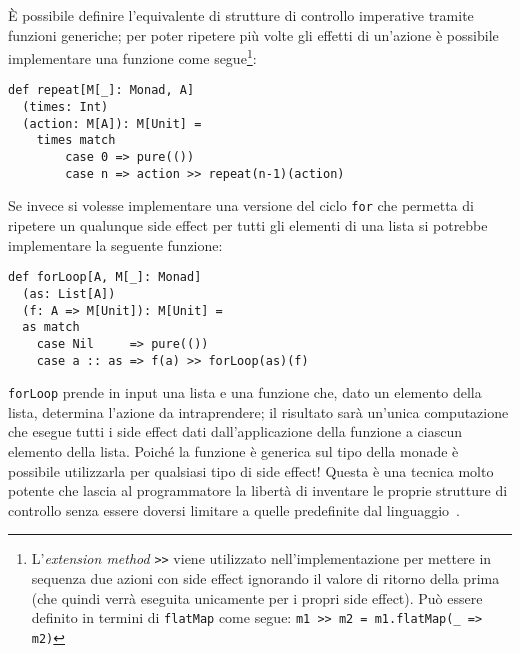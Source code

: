 È possibile definire l'equivalente di strutture di controllo imperative tramite funzioni generiche; per poter ripetere più volte gli effetti di un'azione è possibile implementare una funzione come segue\footnote{L'\emph{extension method} \lstinline{>>} viene utilizzato nell'implementazione per mettere in sequenza due azioni con side effect ignorando il valore di ritorno della prima (che quindi verrà eseguita unicamente per i propri side effect). Può essere definito in termini di \lstinline{flatMap} come segue: \lstinline{m1 >> m2 = m1.flatMap(_ => m2)}}:
\begin{lstlisting}[language=scala3]
def repeat[M[_]: Monad, A]
  (times: Int)
  (action: M[A]): M[Unit] =
	times match
		case 0 => pure(())
		case n => action >> repeat(n-1)(action)
\end{lstlisting}

Se invece si volesse implementare una versione del ciclo \lstinline{for} che permetta di ripetere un qualunque side effect per tutti gli elementi di una lista si potrebbe implementare la seguente funzione:
\begin{lstlisting}[language=scala3]
def forLoop[A, M[_]: Monad]
  (as: List[A])
  (f: A => M[Unit]): M[Unit] = 
  as match 
    case Nil     => pure(())	
    case a :: as => f(a) >> forLoop(as)(f)
\end{lstlisting}
\lstinline{forLoop} prende in input una lista e una funzione che, dato un elemento della lista, determina l'azione da intraprendere; il risultato sarà un'unica computazione che esegue tutti i side effect dati dall'applicazione della funzione a ciascun elemento della lista. Poiché la funzione è generica sul tipo della monade è possibile utilizzarla per qualsiasi tipo di side effect!
Questa è una tecnica molto potente che lascia al programmatore la libertà di inventare le proprie strutture di controllo senza essere doversi limitare a quelle predefinite dal linguaggio~\cite{cit:tackling-the-awkward-squad}.
